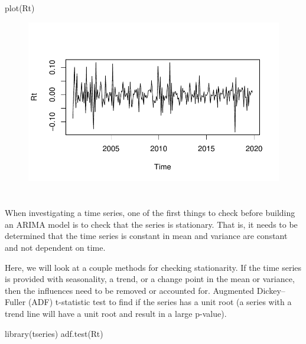\documentclass[
  letterpaper,
  DIV=11,
  numbers=noendperiod]{scrartcl}
\newenvironment{Shaded}{\begin{snugshade}}{\end{snugshade}}
\newcommand{\FunctionTok}[1]{\textcolor[rgb]{0.28,0.35,0.67}{#1}}
\newcommand{\NormalTok}[1]{\textcolor[rgb]{0.00,0.23,0.31}{#1}}
\begin{document}
\begin{Shaded}
\begin{Highlighting}[]
\FunctionTok{plot}\NormalTok{(Rt)}
\end{Highlighting}
\end{Shaded}

\begin{figure}[H]

{\centering \includegraphics{Quarto_files/figure-pdf/unnamed-chunk-15-3.pdf}

}

\end{figure}

\hypertarget{section-1}{%
\section{}\label{section-1}}

When investigating a time series, one of the first things to check
before building an ARIMA model is to check that the series is
stationary. That is, it needs to be determined that the time series is
constant in mean and variance are constant and not dependent on time.

Here, we will look at a couple methods for checking stationarity. If the
time series is provided with seasonality, a trend, or a change point in
the mean or variance, then the influences need to be removed or
accounted for. Augmented Dickey--Fuller (ADF) t-statistic test to find
if the series has a unit root (a series with a trend line will have a
unit root and result in a large p-value).

\begin{Shaded}
\begin{Highlighting}[]
\FunctionTok{library}\NormalTok{(tseries)}
\FunctionTok{adf.test}\NormalTok{(Rt)}
\end{Highlighting}
\end{Shaded}
\end{document}
